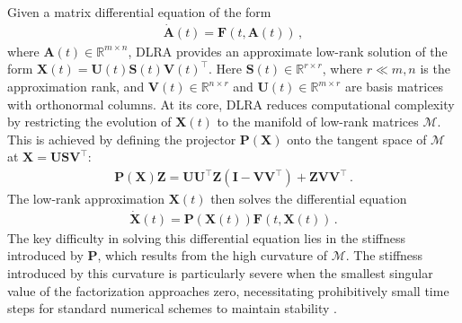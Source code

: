 \documentclass[preprint,runningheads]{svjour3}
\newcommand\bfI{{\mathbf I}}
\newcommand\bfA{{\mathbf A}}
\newcommand\bfF{{\mathbf F}}
\newcommand\bfP{{\mathbf P}}
\newcommand\bfS{{\mathbf S}}
\newcommand\bfU{{\mathbf U}}
\newcommand\bfV{{\mathbf V}}
\newcommand\bfX{{\mathbf X}}
\newcommand\bfZ{{\mathbf Z}}
\begin{document}
Given a matrix differential equation of the form
\begin{align}\label{eq:origProb}
    \dot{\bfA}(t) = \bfF(t,\bfA(t))\,,
\end{align}
where $\bfA(t)\in\mathbb{R}^{m\times n}$, DLRA provides an approximate low-rank solution of the form $\bfX(t) =\bfU(t)\bfS(t)\bfV(t)^{\top}$.  Here $\bfS(t)\in\mathbb{R}^{r\times r}$, where $r\ll m,n$ is the approximation rank, and $\bfV(t)\in\mathbb{R}^{n\times r}$ and $\bfU(t)\in\mathbb{R}^{m\times r}$ are basis matrices with orthonormal columns. At its core, DLRA reduces computational complexity by restricting the evolution of $\bfX(t)$ to the manifold of low-rank matrices $\mathcal{M}$. This is achieved by defining the projector $\bfP(\bfX)$ onto the tangent space of $\mathcal{M}$ at $\bfX=\bfU\bfS\bfV^{\top}$:
\begin{align*}
    \bfP(\bfX)\bfZ = \bfU\bfU^{\top}\bfZ (\bfI - \bfV\bfV^{\top}) + \bfZ\bfV\bfV^{\top}\,.
\end{align*}
The low-rank approximation $\bfX(t)$ then solves the differential equation
\begin{align}\label{eq:proj_flow}
    \dot{\bfX}(t) = \bfP(\bfX(t))\bfF(t,\bfX(t))\,.
\end{align}
The key difficulty in solving this differential equation lies in the stiffness introduced by $\bfP$, which results from the high curvature of  $\mathcal{M}$. The stiffness introduced by this curvature is particularly severe when the smallest singular value of the factorization approaches zero, necessitating prohibitively small time steps for standard numerical schemes to maintain stability \cite{KochLubich07}.
\end{document}
